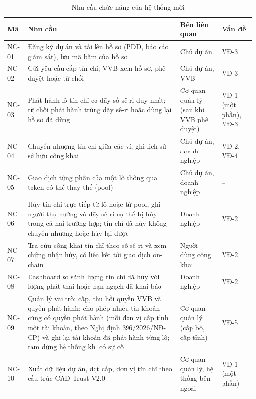 \begin{table}[htbp]
    \centering
    \caption{Nhu cầu chức năng của hệ thống mới}
    \label{tab:ks-nhucauchucnang}
    \small
    \renewcommand{\arraystretch}{1.2}
    \begin{tabularx}{\textwidth}{|p{1.3cm}|X|>{\raggedright\arraybackslash}p{2.8cm}|>{\raggedright\arraybackslash}p{2.1cm}|}
        \hline
        \textbf{Mã} & \textbf{Nhu cầu} & \textbf{Bên liên quan} & \textbf{Vấn đề} \\
        \hline
        NC-01 & Đăng ký dự án và tải lên hồ sơ (PDD, báo cáo giám sát), lưu mã băm của hồ sơ & Chủ dự án & VĐ-3 \\
        \hline
        NC-02 & Gửi yêu cầu cấp tín chỉ; VVB xem hồ sơ, phê duyệt hoặc từ chối & Chủ dự án, VVB & VĐ-3 \\
        \hline
        NC-03 & Phát hành lô tín chỉ có dãy số sê-ri duy nhất; từ chối phát hành trùng dãy sê-ri hoặc dùng lại hồ sơ đã dùng & Cơ quan quản lý (sau khi VVB phê duyệt) & VĐ-1 (một phần), VĐ-3 \\
        \hline
        NC-04 & Chuyển nhượng tín chỉ giữa các ví, ghi lịch sử sở hữu công khai & Chủ dự án, doanh nghiệp & VĐ-2, VĐ-4 \\
        \hline
        NC-05 & Giao dịch từng phần của một lô thông qua token có thể thay thế (pool) & Chủ dự án, doanh nghiệp & -- \\
        \hline
        NC-06 & Hủy tín chỉ trực tiếp từ lô hoặc từ pool, ghi người thụ hưởng và dãy sê-ri cụ thể bị hủy trong cả hai trường hợp; tín chỉ đã hủy không chuyển nhượng hoặc hủy lại được & Doanh nghiệp & VĐ-2 \\
        \hline
        NC-07 & Tra cứu công khai tín chỉ theo số sê-ri và xem chứng nhận hủy, có liên kết tới giao dịch on-chain & Người dùng công khai & VĐ-2 \\
        \hline
        NC-08 & Dashboard so sánh lượng tín chỉ đã hủy với lượng phát thải hoặc hạn ngạch đã khai báo & Doanh nghiệp & VĐ-2 \\
        \hline
        NC-09 & Quản lý vai trò: cấp, thu hồi quyền VVB và quyền phát hành; cho phép nhiều tài khoản cùng có quyền phát hành (mỗi đơn vị cấp tỉnh một tài khoản, theo Nghị định 396/2026/NĐ-CP) và ghi lại tài khoản đã phát hành từng lô; tạm dừng hệ thống khi có sự cố & Cơ quan quản lý (cấp bộ, cấp tỉnh) & VĐ-5 \\
        \hline
        NC-10 & Xuất dữ liệu dự án, đợt cấp, đơn vị tín chỉ theo cấu trúc CAD Trust V2.0 & Cơ quan quản lý, hệ thống bên ngoài & VĐ-1 (một phần) \\
        \hline
    \end{tabularx}
\end{table}

